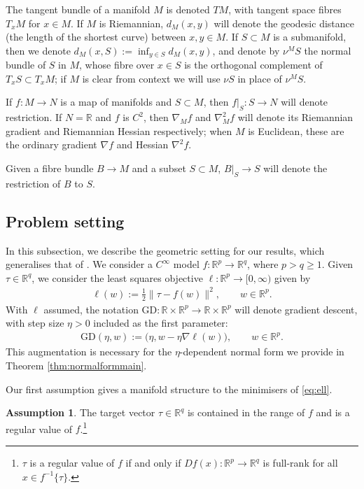 \documentclass{article}
\newcommand{\RB}{\mathbb{R}}
\newcommand{\GD}{\mathrm{GD}}
\theoremstyle{plain}
\theoremstyle{definition}
\newtheorem{assumption}[theorem]{Assumption}
\theoremstyle{remark}
\begin{document}
The tangent bundle of a manifold $M$ is denoted $TM$, with tangent space fibres $T_xM$ for $x\in M$. If $M$ is Riemannian, $d_M(x,y)$ will denote the geodesic distance (the length of the shortest curve) between $x,y\in M$. If $S\subset M$ is a submanifold, then we denote $d_M(x,S):=\inf_{y\in S}d_M(x,y)$, and denote by $\nu^MS$ the normal bundle of $S$ in $M$, whose fibre over $x\in S$ is the orthogonal complement of $T_xS\subset T_xM$; if $M$ is clear from context we will use $\nu S$ in place of $\nu^MS$.

If $f:M\rightarrow N$ is a map of manifolds and $S\subset M$, then $f|_S:S\rightarrow N$ will denote restriction. If $N=\RB$ and $f$ is $C^2$, then $\nabla_Mf$ and $\nabla_M^2f$ will denote its Riemannian gradient and Riemannian Hessian respectively; when $M$ is Euclidean, these are the ordinary gradient $\nabla f$ and Hessian $\nabla^2f$.

Given a fibre bundle $B\rightarrow M$ and a subset $S\subset M$, $B|_S\rightarrow S$ will denote the restriction of $B$ to $S$.

\subsection{Problem setting}\label{subsec:problemsetting}

In this subsection, we describe the geometric setting for our results, which generalises that of \cite{macdonaldeos}. We consider a $C^{\infty}$ model $f:\RB^p\rightarrow\RB^q$, where $p>q\geq 1$. Given $\tau\in\RB^q$, we consider the least squares objective $\ell:\RB^p\rightarrow[0,\infty)$ given by
\begin{align}\label{eq:ell}
\ell(w):=\frac{1}{2}\|\tau-f(w)\|^2,\qquad w\in\RB^p.
\end{align}
With $\ell$ assumed, the notation $\GD:\RB\times \RB^p\rightarrow\RB\times \RB^p$ will denote gradient descent, with step size $\eta>0$ included as the first parameter:
\begin{align}
\GD(\eta,w):=\big(\eta,w-\eta\nabla\ell(w)\big),\qquad w\in\RB^p.
\end{align}
This augmentation is necessary for the $\eta$-dependent normal form we provide in Theorem \ref{thm:normalformmain}.

Our first assumption gives a manifold structure to the minimisers of \eqref{eq:ell}.

\begin{assumption}\label{ass:regularity}
    The target vector $\tau\in\RB^q$ is contained in the range of $f$ and is a regular value of $f$.\footnote{$\tau$ is a regular value of $f$ if and only if $Df(x):\RB^p\rightarrow\RB^q$ is full-rank for all $x\in f^{-1}\{\tau\}$.}
\end{assumption}
\end{document}
